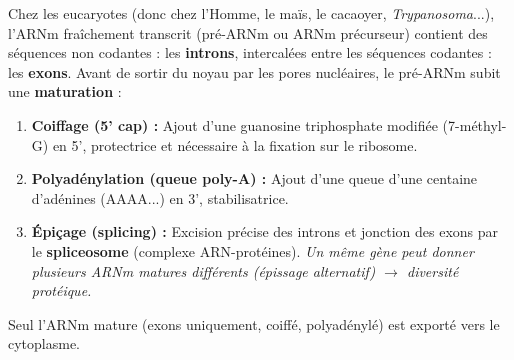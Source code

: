 \documentclass[11pt]{article}
\begin{document}
\begin{savaistu}
Chez les eucaryotes (donc chez l'Homme, le maïs, le cacaoyer, \emph{Trypanosoma}...), l'ARNm fraîchement transcrit (pré-ARNm ou ARNm précurseur) contient des séquences non codantes : les \textbf{introns}, intercalées entre les séquences codantes : les \textbf{exons}. Avant de sortir du noyau par les pores nucléaires, le pré-ARNm subit une \textbf{maturation} :
\begin{enumerate}
\item \textbf{Coiffage (5' cap) :} Ajout d'une guanosine triphosphate modifiée (7-méthyl-G) en 5', protectrice et nécessaire à la fixation sur le ribosome.
\item \textbf{Polyadénylation (queue poly-A) :} Ajout d'une queue d'une centaine d'adénines (AAAA...) en 3', stabilisatrice.
\item \textbf{Épiçage (splicing) :} Excision précise des introns et jonction des exons par le \textbf{spliceosome} (complexe ARN-protéines). \emph{Un même gène peut donner plusieurs ARNm matures différents (épissage alternatif) $\to$ diversité protéique.}
\end{enumerate}
Seul l'ARNm mature (exons uniquement, coiffé, polyadénylé) est exporté vers le cytoplasme.
\end{savaistu}
\end{document}
